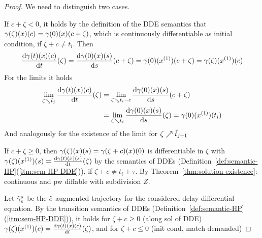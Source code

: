 \begin{proof}
        We need to distinguish two cases.

        If $c+\zeta<0$, it holds by the definition of the DDE semantics that $\trajectory(\zeta)(x)(c)=\trajectory(0)(x)(c+\zeta)$, which is continuously differentiable as initial condition, if $\zeta+c\neq t_i$. Then
        \begin{equation*}
            \DD{\trajectory(t)(x)(c)}{t}(\zeta)=\DD{\trajectory(0)(x)(s)}{s}(c+\zeta)=\trajectory(0)(\D{x})(c+\zeta)=\trajectory(\zeta)(\D{x})(c)
        \end{equation*}
        For the limits it holds
        \begin{align*}
            \lim_{\zeta\downto\hat{t}_j} \DD{\trajectory(t)(x)(c)}{t}(\zeta)
                & = \lim_{\zeta\downto t_i-c} \DD{\trajectory(0)(x)(s)}{s}(c+\zeta)\\
                & = \lim_{\zeta\downto t_i} \DD{\trajectory(0)(x)(s)}{s}(\zeta)
                = \trajectory(0)(\D{x})(t_i)
        \end{align*}
        And analogously for the existence of the limit for $\zeta\upto\hat{t}_{j+1}$

        If $c+\zeta\geq 0$, then $\trajectory(\zeta)(x)(s)=\trajectory(\zeta+c)(x)(0)$ is differentiable in $\zeta$ with $\trajectory(\zeta)(\D{x})(s) = \DD{\trajectory(t)(x)(s)}{t}(\zeta)$ by the semantics of DDEs (Definition~\ref{def:semantic-HP}(\ref{itm:sem-HP-DDE})), if $\zeta+c\neq t_i+\tau$.
        By Theorem~\ref{thm:solution-existence}: continuous and pw diffable with subdivision $Z$.



        Let $\augtrajectory[s]{\astrm}$ be the $\bstrm$-augmented trajectory for the considered delay differential equation.
        By the transition semantics of DDEs (Definition~\ref{def:semantic-HP}\,(\ref{itm:sem-HP-DDE})), it holds for $\zeta+c\geq 0$ (along sol of DDE)
        $\trajectory(\zeta)(\D{x})(c) = \DD{\trajectory(t)(x)(c)}{t}(\zeta)$, and for $\zeta+c\leq 0$ (init cond, match demanded)


\end{proof}
